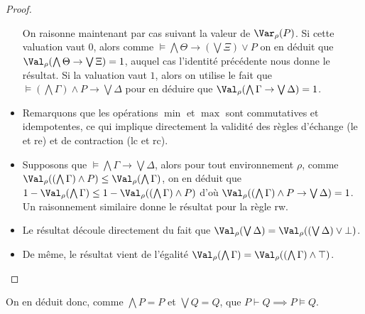 \begin{proof}
\begin{itemize}
    On raisonne maintenant par cas suivant la valeur de $\Var_\rho(P)$. Si cette
    valuation vaut $0$, alors comme
    $\models \bigwedge \Theta\to (\bigvee\Xi) \lor P$ on en déduit que
    $\Val_\rho(\bigwedge\Theta\to\bigvee\Xi) = 1$, auquel cas l'identité
    précédente nous donne le résultat. Si la valuation vaut $1$, alors on
    utilise le fait que $\models(\bigwedge\Gamma)\land P\to\bigvee \Delta$ pour
    en déduire que $\Val_\rho(\bigwedge\Gamma\to\bigvee\Delta) = 1$.
  \item Remarquons que les opérations $\min$ et $\max$ sont commutatives et
    idempotentes, ce qui implique directement la validité des règles d'échange
    (le et re) et de contraction (lc et rc).
  \item Supposons que $\models\bigwedge\Gamma\to\bigvee\Delta$, alors pour tout
    environnement $\rho$, comme
    $\Val_\rho((\bigwedge\Gamma)\land P) \leq \Val_\rho(\bigwedge\Gamma)$, on
    en déduit que
    $1 - \Val_\rho(\bigwedge\Gamma) \leq 1 - \Val_\rho((\bigwedge\Gamma)\land P)$
    d'où $\Val_\rho((\bigwedge\Gamma)\land P\to\bigvee\Delta) = 1$. Un
    raisonnement similaire donne le résultat pour la règle rw.
  \item Le résultat découle directement du fait que
    $\Val_\rho(\bigvee\Delta) = \Val_\rho((\bigvee\Delta)\lor\bot)$.
  \item De même, le résultat vient de l'égalité
    $\Val_\rho(\bigwedge\Gamma) = \Val_\rho((\bigwedge\Gamma)\land\top)$.
  \end{itemize}
\end{proof}

On en déduit donc, comme $\bigwedge P = P$ et $\bigvee Q = Q$, que
$P\vdash Q \implies P \vDash Q$.
